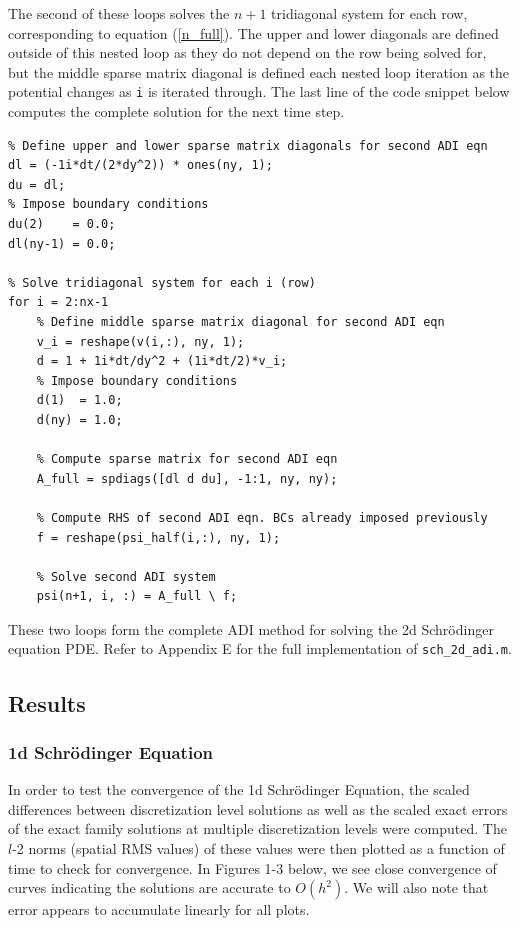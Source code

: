 \documentclass[10pt]{article}
\def\code#1{\texttt{#1}} %
\begin{document}
The second of these loops solves the $n+1$ tridiagonal system for each row, corresponding to  
equation (\ref{n_full}). The upper and lower diagonals are defined outside of this nested loop as 
they do not depend on the row being solved for, but the middle sparse matrix diagonal is defined
each nested loop iteration as the potential changes as \code{i} is iterated through. The last line
of the code snippet below computes the complete solution for the next time step.
\begin{verbatim}
% Define upper and lower sparse matrix diagonals for second ADI eqn
dl = (-1i*dt/(2*dy^2)) * ones(ny, 1);
du = dl;
% Impose boundary conditions
du(2)    = 0.0;
dl(ny-1) = 0.0;

% Solve tridiagonal system for each i (row)
for i = 2:nx-1
    % Define middle sparse matrix diagonal for second ADI eqn
    v_i = reshape(v(i,:), ny, 1);
    d = 1 + 1i*dt/dy^2 + (1i*dt/2)*v_i;
    % Impose boundary conditions 
    d(1)  = 1.0;
    d(ny) = 1.0;

    % Compute sparse matrix for second ADI eqn
    A_full = spdiags([dl d du], -1:1, ny, ny);

    % Compute RHS of second ADI eqn. BCs already imposed previously
    f = reshape(psi_half(i,:), ny, 1);

    % Solve second ADI system
    psi(n+1, i, :) = A_full \ f;
\end{verbatim}

These two loops form the complete ADI method for solving the 2d Schrödinger equation PDE.
Refer to Appendix E for the full implementation of \code{sch\_2d\_adi.m}.

\subsection*{Results}

\subsubsection*{1d Schrödinger Equation}

In order to test the convergence of the 1d Schrödinger Equation, the scaled differences between 
discretization level solutions as well as the scaled exact errors of the exact family solutions at 
multiple discretization levels were computed. The $l$-2 norms (spatial RMS values) of these values 
were then plotted as a function of time to check for convergence. In Figures 1-3 below, we see close 
convergence of curves indicating the solutions are accurate to $O(h^2)$. We will also note that error
appears to accumulate linearly for all plots.
\end{document}
